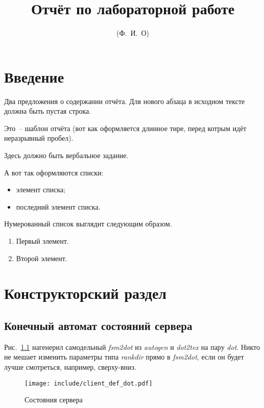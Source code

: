 \documentclass[a4paper,12pt]{report}
\title{Отчёт по лабораторной работе \textnumero 1}
\author{(Ф.~И.~О)}
\begin{document}
\maketitle

\tableofcontents

\chapter*{Введение}

Два предложения о содержании отчёта. Для нового абзаца в исходном тексте должна быть пустая строка.

Это~-- шаблон отчёта (вот как оформляется длинное тире, перед котрым идёт неразрывный пробел).


Здесь должно быть вербальное задание.

А вот так оформляются списки:
\begin{itemize}
\item элемент списка;
\item последний элемент списка.
\end{itemize}

Нумерованный список выглядит следующим образом.
\begin{enumerate}
\item Первый элемент.
\item Второй элемент.
\end{enumerate}


\chapter{Конструкторский раздел}

\section{Конечный автомат состояний сервера}

Рис.~\ref{fig:fsm} нагенерил самодельный \textit{fsm2dot} из \textit{autogen} и \textit{dot2tex} на пару \textit{dot}. Никто не мешает изменить параметры типа \textit{rankdir} прямо в \textit{fsm2dot}, если он будет лучше смотреться, например, сверху-вниз.

\begin{figure}
\centering
\texttt{[image: include/client\_def\_dot.pdf]}
\caption{Состояния сервера}
\label{fig:fsm}
\end{figure}
\end{document}
